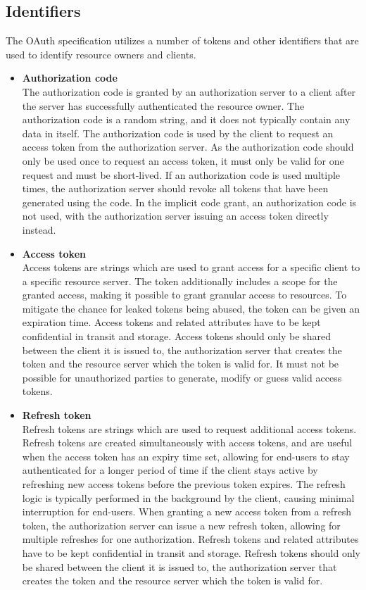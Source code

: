 \subsection{Identifiers}
The OAuth specification utilizes a number of tokens and other identifiers that are used to identify resource owners and clients.
\begin{itemize}
    \item \textbf{Authorization code} \\
    The authorization code is granted by an authorization server to a client after the server has successfully authenticated the resource owner.
    The authorization code is a random string, and it does not typically contain any data in itself.
    The authorization code is used by the client to request an access token from the authorization server.
    As the authorization code should only be used once to request an access token, it must only be valid for one request and must be short-lived.
    If an authorization code is used multiple times, the authorization server should revoke all tokens that have been generated using the code.
    In the implicit code grant, an authorization code is not used, with the authorization server issuing an access token directly instead.
    \item \textbf{Access token} \\
    Access tokens are strings which are used to grant access for a specific client to a specific resource server.
    The token additionally includes a scope for the granted access, making it possible to grant granular access to resources.
    To mitigate the chance for leaked tokens being abused, the token can be given an expiration time.
    Access tokens and related attributes have to be kept confidential in transit and storage.
    Access tokens should only be shared between the client it is issued to, the authorization server that creates the token and the resource server which the token is valid for.
    It must not be possible for unauthorized parties to generate, modify or guess valid access tokens.
    \item \textbf{Refresh token} \\
    Refresh tokens are strings which are used to request additional access tokens.
    Refresh tokens are created simultaneously with access tokens, and are useful when the access token has an expiry time set, allowing for end-users to stay authenticated for a longer period of time if the client stays active by refreshing new access tokens before the previous token expires.
    The refresh logic is typically performed in the background by the client, causing minimal interruption for end-users.
    When granting a new access token from a refresh token, the authorization server can issue a new refresh token, allowing for multiple refreshes for one authorization.
    Refresh tokens and related attributes have to be kept confidential in transit and storage.
    Refresh tokens should only be shared between the client it is issued to, the authorization server that creates the token and the resource server which the token is valid for.    
\end{itemize}

